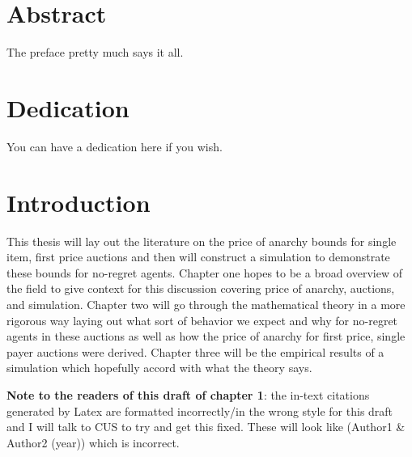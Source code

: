\documentclass[12pt,twoside]{reedthesis}
\begin{document}
    \chapter*{Abstract}
	The preface pretty much says it all.
	
	\chapter*{Dedication}
	You can have a dedication here if you wish.

  \mainmatter %
  \pagestyle{fancyplain} %


    \chapter*{Introduction}

\doublespacing
	
	This thesis will lay out the literature on the price of anarchy bounds for single item, first price auctions and then will construct a simulation to demonstrate these bounds for no-regret agents. Chapter one hopes to be a broad overview of the field to give context for this discussion covering price of anarchy, auctions, and simulation. Chapter two will go through the mathematical theory in a more rigorous way laying out what sort of behavior we expect and why for no-regret agents in these auctions as well as how the price of anarchy for first price, single payer auctions were derived. Chapter three will be the empirical results of a simulation which hopefully accord with what the theory says. 
	
	\textbf{Note to the readers of this draft of chapter 1}: the in-text citations generated by Latex are formatted incorrectly/in the wrong style for this draft and I will talk to CUS to try and get this fixed. These will look like (Author1 \& Author2 (year)) which is incorrect.
\end{document}
